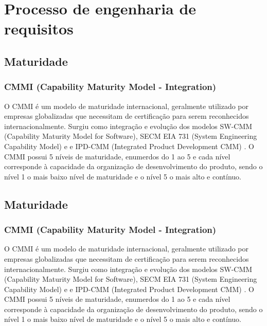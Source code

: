 \chapter{Processo de engenharia de requisitos}

\section{Maturidade}
  \subsection{CMMI (Capability Maturity Model - Integration)}

  O CMMI é um modelo de maturidade internacional, geralmente utilizado por empresas
  globalizadas que necessitam de certificação para serem reconhecidos internacionalmente.
  Surgiu como integração e evolução dos modelos SW-CMM (Capability Maturity Model for Software),
  SECM EIA 731 (System Engineering Capability Model) e  e IPD-CMM
  (Integrated Product Development CMM) \cite{mct2006}.
  O CMMI possui 5 níveis de maturidade, enumerdos do 1 ao 5 e cada nível corresponde
  à capacidade da organização de desenvolvimento do produto, sendo o nível 1 o mais
  baixo nível de maturidade e o nível 5 o mais alto e contínuo.

\section{Maturidade}
  \subsection{CMMI (Capability Maturity Model - Integration)}

  O CMMI é um modelo de maturidade internacional, geralmente utilizado por empresas
  globalizadas que necessitam de certificação para serem reconhecidos internacionalmente.
  Surgiu como integração e evolução dos modelos SW-CMM (Capability Maturity Model for Software),
  SECM EIA 731 (System Engineering Capability Model) e  e IPD-CMM
  (Integrated Product Development CMM) \cite{mct2006}.
  O CMMI possui 5 níveis de maturidade, enumerdos do 1 ao 5 e cada nível corresponde
  à capacidade da organização de desenvolvimento do produto, sendo o nível 1 o mais
  baixo nível de maturidade e o nível 5 o mais alto e contínuo.

